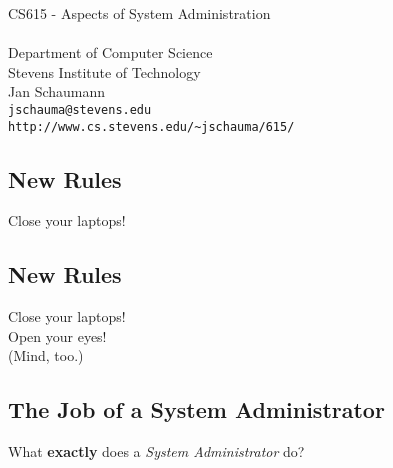 \documentclass[xga]{xdvislides}
\begin{document}
\setfontphv

\lhead{\slidetitle}				%
\cfoot{\relax}					%
\rfoot{\Gray{\today}}

\vspace*{\fill}
\begin{center}
	\Hugesize
		CS615 - Aspects of System Administration\\ [1em]
	\hspace*{5mm}\blueline\\ [1em]
	\Normalsize
		Department of Computer Science\\
		Stevens Institute of Technology\\
		Jan Schaumann\\
		\verb+jschauma@stevens.edu+ \\
		\verb+http://www.cs.stevens.edu/~jschauma/615/+
\end{center}
\vspace*{\fill}

\subsection{New Rules}
\Hugesize
\vspace*{\fill}
\begin{center}
Close your laptops!
\end{center}
\vspace*{\fill}
\Normalsize

\subsection{New Rules}
\Hugesize
\vspace*{\fill}
\begin{center}
Close your laptops! \\
\vspace{.5in}
Open your eyes! \\
\small
(Mind, too.)
\end{center}
\vspace*{\fill}
\Normalsize



\subsection{The Job of a System Administrator}
What {\bf exactly} does a {\em System Administrator} do?
\end{document}
